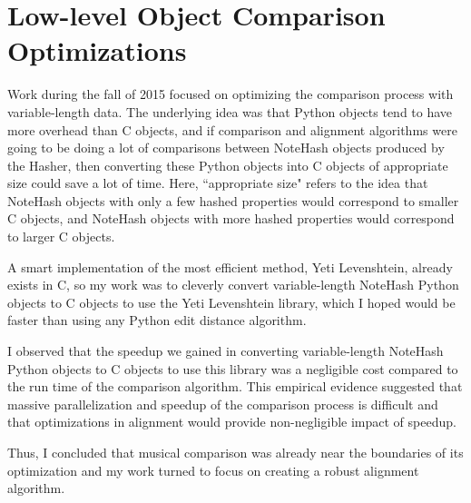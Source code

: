 \section{Low-level Object Comparison Optimizations }
Work during the fall of 2015 focused on optimizing the comparison process with variable-length data. The underlying idea was that Python objects tend to have more overhead than C objects, and if comparison and alignment algorithms were going to be doing a lot of comparisons between NoteHash objects produced by the Hasher, then converting these Python objects into C objects of appropriate size could save a lot of time. Here, ``appropriate size" refers to the idea that NoteHash objects with only a few hashed properties would correspond to smaller C objects, and NoteHash objects with more hashed properties would correspond to larger C objects. 

A smart implementation of the most efficient method, Yeti Levenshtein, already exists in C, so my work was to cleverly convert variable-length NoteHash Python objects to C objects to use the Yeti Levenshtein library, which I hoped would be faster than using any Python edit distance algorithm.

I observed that the speedup we gained in converting variable-length NoteHash Python objects to C objects to use this library was a negligible cost compared to the run time of the comparison algorithm. This empirical evidence suggested that massive parallelization and speedup of the comparison process is difficult and that optimizations in alignment would provide non-negligible impact of speedup.

Thus, I concluded that musical comparison was already near the boundaries of its optimization and my work turned to focus on creating a robust alignment algorithm. 